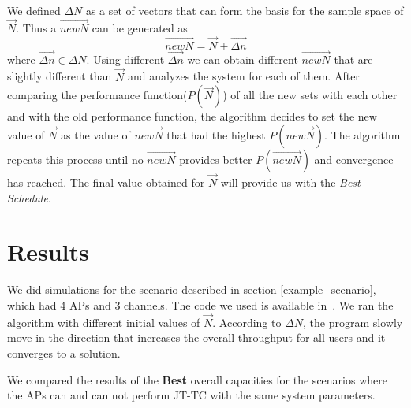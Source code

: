 

We defined $\Delta {N}$ as a set of vectors that can form the basis for the sample space of $\vec{N}$.
Thus a $\overrightarrow{newN}$ can be generated as
\begin{equation*}
    \overrightarrow{newN} = \vec{N} + \overrightarrow{\Delta n}
\end{equation*}
where $\overrightarrow{\Delta n} \in \Delta N$. 
Using different $\overrightarrow{\Delta n}$ we can obtain different $\overrightarrow{newN}$ that are slightly different than $\vec{N}$ and analyzes the system for each of them.
After comparing the performance function($P(\vec{N})$) of all the new sets with each other and with the old performance function, the algorithm decides to set the new value of $\vec{N}$ as the value of $\overrightarrow{newN}$ that had the highest $P(\overrightarrow{newN})$.
The algorithm repeats this process until no $\overrightarrow{newN}$ provides better $P(\overrightarrow{newN})$ and convergence has reached. The final value obtained for $\vec{N}$ will provide us with the \emph{Best Schedule}.

\section{Results}
\label{sec:results}
We did simulations for the scenario described in section \ref{example_scenario}, which had 4 APs and 3 channels.
The code we used is available in~\cite{code:onlineSchedulingJT}.
We ran the algorithm with different initial values of $\vec{N}$. According to $\Delta {N}$, the program slowly move in the direction that increases the overall throughput for all users and it converges to a solution.

We compared the results of the \textbf{Best} overall capacities for the scenarios where the APs can and can not perform JT-TC with the same system parameters.




